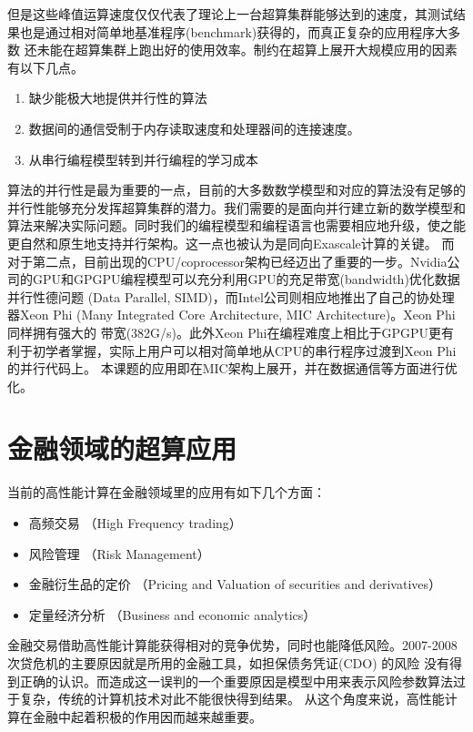 但是这些峰值运算速度仅仅代表了理论上一台超算集群能够达到的速度，其测试结果也是通过相对简单地基准程序(benchmark)获得的，而真正复杂的应用程序大多数
还未能在超算集群上跑出好的使用效率。制约在超算上展开大规模应用的因素有以下几点。
\begin{enumerate}
    \item 缺少能极大地提供并行性的算法
	\item 数据间的通信受制于内存读取速度和处理器间的连接速度。
	\item 从串行编程模型转到并行编程的学习成本
\end{enumerate}
算法的并行性是最为重要的一点，目前的大多数数学模型和对应的算法没有足够的并行性能够充分发挥超算集群的潜力。我们需要的是面向并行建立新的数学模型和
算法来解决实际问题。同时我们的编程模型和编程语言也需要相应地升级，使之能更自然和原生地支持并行架构。这一点也被认为是同向Exascale计算的关键。
而对于第二点，目前出现的CPU/coprocessor架构已经迈出了重要的一步。Nvidia公司的GPU和GPGPU编程模型可以充分利用GPU的充足带宽(bandwidth)优化数据并行性德问题
(Data Parallel, SIMD)，而Intel公司则相应地推出了自己的协处理器Xeon Phi (Many Integrated Core Architecture, MIC Architecture)。Xeon Phi同样拥有强大的
带宽(382G/s)。此外Xeon Phi在编程难度上相比于GPGPU更有利于初学者掌握，实际上用户可以相对简单地从CPU的串行程序过渡到Xeon Phi的并行代码上。
本课题的应用即在MIC架构上展开，并在数据通信等方面进行优化。


\section{金融领域的超算应用} %
\label{sec:intro-finance}
当前的高性能计算在金融领域里的应用有如下几个方面：
\begin{itemize}
\item 高频交易 （High Frequency trading）
\item 风险管理 （Risk Management）
\item 金融衍生品的定价 （Pricing and Valuation of securities and derivatives）
\item 定量经济分析 （Business and economic analytics）
\end{itemize}
金融交易借助高性能计算能获得相对的竞争优势，同时也能降低风险。2007-2008 次贷危机的主要原因就是所用的金融工具，如担保债务凭证(CDO) 的风险
没有得到正确的认识。而造成这一误判的一个重要原因是模型中用来表示风险参数算法过于复杂，传统的计算机技术对此不能很快得到结果。
从这个角度来说，高性能计算在金融中起着积极的作用因而越来越重要。

